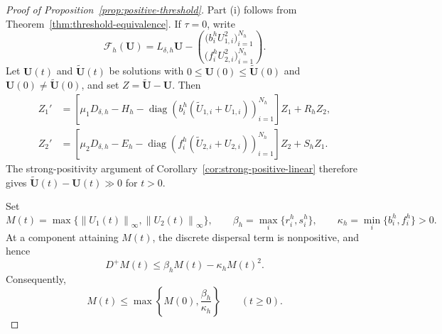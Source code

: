 \documentclass[11pt]{article}
\theoremstyle{definition}
\newcommand{\norm}[1]{\left\lVert #1\right\rVert}
\newcommand{\U}{\bm U}
\begin{document}
\begin{proof}[Proof of Proposition~\ref{prop:positive-threshold}]
Part (i) follows from Theorem~\ref{thm:threshold-equivalence}.  If $\tau=0$, write
\[
 \mathcal F_h(\U)
 =
 L_{\delta,h}\U
 -
 \binom{
 \big(b_i^hU_{1,i}^2\big)_{i=1}^{N_h}}
 {
 \big(f_i^hU_{2,i}^2\big)_{i=1}^{N_h}}.
\]
Let $\U(t)$ and $\widetilde{\U}(t)$ be solutions with $0\le\U(0)\le\widetilde{\U}(0)$ and $\U(0)\ne\widetilde{\U}(0)$, and set $Z=\widetilde{\U}-\U$.  Then
\[
 \begin{aligned}
 Z_1'
 &=
 \left[
 \mu_1D_{\delta,h}-H_h
 -\operatorname{diag}\!\left(
 b_i^h(\widetilde U_{1,i}+U_{1,i})
 \right)_{i=1}^{N_h}
 \right]Z_1
 +R_hZ_2,\\
 Z_2'
 &=
 \left[
 \mu_2D_{\delta,h}-E_h
 -\operatorname{diag}\!\left(
 f_i^h(\widetilde U_{2,i}+U_{2,i})
 \right)_{i=1}^{N_h}
 \right]Z_2
 +S_hZ_1.
 \end{aligned}
\]
The strong-positivity argument of Corollary~\ref{cor:strong-positive-linear} therefore gives $\widetilde{\U}(t)-\U(t)\gg0$ for $t>0$.

Set
\[
 M(t)
 =
 \max\{\norm{U_1(t)}_\infty,\norm{U_2(t)}_\infty\},
 \qquad
 \beta_h=\max_i\{r_i^h,s_i^h\},
 \qquad
 \kappa_h=\min_i\{b_i^h,f_i^h\}>0.
\]
At a component attaining $M(t)$, the discrete dispersal term is
nonpositive, and hence
\[
 D^+M(t)
 \le
 \beta_hM(t)-\kappa_hM(t)^2.
\]
Consequently,
\[
 M(t)
 \le
 \max\left\{
 M(0),\frac{\beta_h}{\kappa_h}
 \right\}
 \qquad(t\ge0).
\]


\end{proof}
\end{document}
